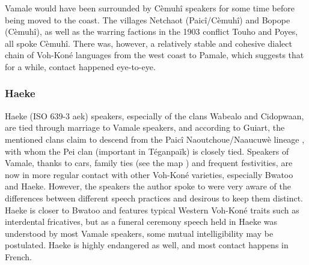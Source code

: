  
 Vamale would have been surrounded by Cèmuhî speakers for some time before being moved to the coast. The villages Netchaot (Paicî\slash Cèmuhî) and Bopope (Cèmuhî), as well as the warring factions in the 1903 conflict Touho and Poyes, all spoke Cèmuhî. There was, however, a relatively stable and cohesive dialect chain of Voh-Koné languages from the west coast to Pamale, which suggests that for a while, contact happened eye-to-eye.
 
 \newpage
 \subsubsection{Haeke}
 \label{ssec:haeke}

 \begin{sloppypar}
 Haeke (ISO 639-3 aek) speakers, especially of the clans Wabealo and Cidopwaan, are tied through marriage to Vamale speakers, and according to Guiart, the mentioned clans claim to descend from the Paicî Naoutchoue/Naaucuwè lineage \parencite[92]{guiart_laire_1992}, with whom the Pei clan (important in Téganpaïk) is closely tied. Speakers of Vamale, thanks to cars, family ties (see the map ) and frequent festivities, are now in more regular contact with other Voh-Koné varieties, especially Bwatoo and Haeke. However, the speakers the author spoke to were very aware of the differences between different speech practices and desirous to keep them distinct. Haeke is closer to Bwatoo and features typical Western Voh-Koné traits such as interdental fricatives, but as a funeral ceremony speech held in Haeke was understood by most Vamale speakers, some mutual intelligibility may be postulated. Haeke is highly endangered as well, and most contact happens in French. 
 \end{sloppypar}
 
 
 
 	
